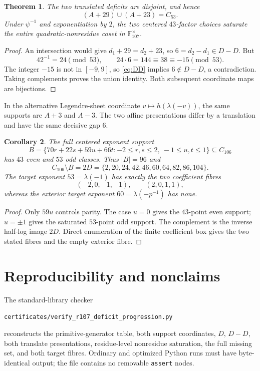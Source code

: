 \documentclass[11pt]{article}
\newtheorem{theorem}{Theorem}
\newtheorem{corollary}[theorem]{Corollary}
\begin{document}
\begin{theorem}
The two translated deficits are disjoint, and hence
\[
(A+29)\cup(A+23)=C_{53}.
\]
Under $\psi^{-1}$ and exponentiation by $2$, the two centered $43$-factor
choices saturate the entire quadratic-nonresidue coset in
$\mathbb F_{107}^{\times}$.
\end{theorem}

\begin{proof}
An intersection would give $d_1+29=d_2+23$, so $6=d_2-d_1\in D-D$.  But
\[
42^{-1}=24\pmod{53},
\qquad24\cdot6=144\equiv38\equiv-15\pmod{53}.
\]
The integer $-15$ is not in $[-9,9]$, so \eqref{eq:DD} implies
$6\notin D-D$, a contradiction.  Taking complements proves the union
identity.  Both subsequent coordinate maps are bijections.
\end{proof}

In the alternative Legendre-sheet coordinate $v\mapsto h(\lambda(-v))$, the
same supports are $A+3$ and $A-3$.  The two affine presentations differ by a
translation and have the same decisive gap $6$.

\begin{corollary}
The full centered exponent support
\[
B=\{70r+22s+59u+66t:
-2\leq r,s\leq2,\ -1\leq u,t\leq1\}\subseteq C_{106}
\]
has $43$ even and $53$ odd classes.  Thus $|B|=96$ and
\[
C_{106}\setminus B=2D
=\{2,20,24,42,46,60,64,82,86,104\}.
\]
The target exponent $53=\lambda(-1)$ has exactly the two coefficient fibres
\[
(-2,0,-1,-1),\qquad(2,0,1,1),
\]
whereas the exterior target exponent $60=\lambda(-p^{-1})$ has none.
\end{corollary}

\begin{proof}
Only $59u$ controls parity.  The case $u=0$ gives the $43$-point even support;
$u=\pm1$ gives the saturated $53$-point odd support.  The complement is the
inverse half-log image $2D$.  Direct enumeration of the finite coefficient
box gives the two stated fibres and the empty exterior fibre.
\end{proof}

\section{Reproducibility and nonclaims}

The standard-library checker
\begin{center}
\texttt{certificates/verify\_r107\_deficit\_progression.py}
\end{center}
reconstructs the primitive-generator table, both support coordinates, $D$,
$D-D$, both translate presentations, residue-level nonresidue saturation,
the full missing set, and both target fibres.  Ordinary and optimized Python
runs must have byte-identical output; the file contains no removable
\texttt{assert} nodes.
\end{document}
